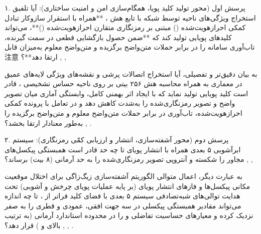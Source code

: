 

۱. پرسش اول (محور تولید کلید پویا، همگام‌سازی امن و امنیت ساختاری): آیا تلفیق استخراج ویژگی‌های ناحیه  توسط شبکه  با تابع هش ، **همراه با استقرار سازوکار تبادل کمکی احرازهویت‌شده () مبتنی بر رمزنگاری متقارن احرازهویت‌شده ()**، می‌تواند کلیدهای پویایی تولید کند که **ضمن حصول بازگشایی قطعی در سمت گیرنده، تاب‌آوری سامانه را در برابر حملات متن‌واضح برگزیده  و متن‌واضح معلوم  به‌میزان قابل‌注意 ارتقا دهد**؟ , , \par

به بیان دقیق‌تر و تفصیلی، آیا استخراج اتصالات پرشی  و نقشه‌های ویژگی لایه‌های عمیق در معماری  به همراه محاسبه هش ۲۵۶ بیتی  بر روی ناحیه حساس تشخیصی ، قادر است کلید پویایی تولید نماید که با ایجاد اثر بهمنی  کامل، وابستگی آماری میان تصویر واضح و تصویر رمزنگاری‌شده را به‌شدت کاهش دهد و در تعامل با پرونده کمکی احرازهویت‌شده، تاب‌آوری در برابر حملات متن‌واضح معلوم  و متن‌واضح برگزیده  را به‌طور معنادار ارتقا بخشد؟ , .\par



۲. پرسش دوم (محور آشفته‌سازی، انتشار و ارزیابی کمّی رمزنگاری): سیستم ابرآشوبی ۵ بعدی همراه با انتشار پویای  تا چه حد قادر است همبستگی پیکسل‌های مجاور را شکسته و آنتروپی تصویر رمزنگاری‌شده را به حد آرمانی (۸ بیت) برساند؟ , , \par

به عبارت دیگر، اعمال متوالی الگوریتم آشفته‌سازی زیگ‌زاگی  برای اختلال موقعیت مکانی پیکسل‌ها و فازهای انتشار پویای  (بر پایه عملیات پویای چرخش  و  آشوبی) تحت هدایت توالی‌های شبه‌تصادفی سیستم ۵ بعدی با فضای کلید فراتر از ، تا چه اندازه می‌تواند مقادیر همبستگی پیکسلی در سه جهت افقی، عمودی و قطری را به صفر نزدیک کرده و معیارهای حساسیت تفاضلی  و  را در محدوده استاندارد آرمانی (به ترتیب بالای  و ) قرار دهد؟ , , .\par

